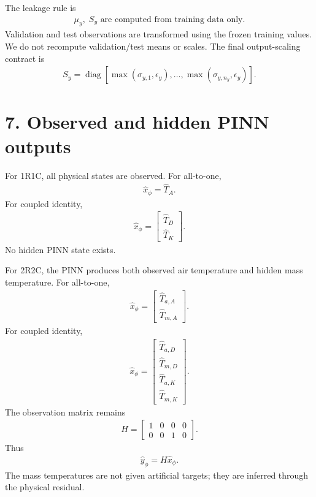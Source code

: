 \documentclass[11pt]{article}
\begin{document}
The leakage rule is
\begin{align}
\boxed{\mu_y,\;S_y\text{ are computed from training data only.}}
\tag{P2.28}
\end{align}
Validation and test observations are transformed using the frozen training values. We do not recompute validation/test means or scales. The final output-scaling contract is
\begin{align}
\boxed{S_y=\operatorname{diag}\left[\max(\sigma_{y,1},\epsilon_y),\ldots,\max(\sigma_{y,n_y},\epsilon_y)\right].}
\tag{P2.29}
\end{align}

\section*{7. Observed and hidden PINN outputs}
For 1R1C, all physical states are observed. For all-to-one,
\begin{align}
\boxed{\widehat x_\phi=\widehat T_A.}
\tag{P2.30}
\end{align}
For coupled identity,
\begin{align}
\boxed{\widehat x_\phi=\begin{bmatrix}\widehat T_D\\\widehat T_K\end{bmatrix}.}
\tag{P2.31}
\end{align}
No hidden PINN state exists.

For 2R2C, the PINN produces both observed air temperature and hidden mass temperature. For all-to-one,
\begin{align}
\boxed{\widehat x_\phi=\begin{bmatrix}\widehat T_{a,A}\\\widehat T_{m,A}\end{bmatrix}.}
\tag{P2.32}
\end{align}
For coupled identity,
\begin{align}
\boxed{\widehat x_\phi=\begin{bmatrix}\widehat T_{a,D}\\\widehat T_{m,D}\\\widehat T_{a,K}\\\widehat T_{m,K}\end{bmatrix}.}
\tag{P2.33}
\end{align}
The observation matrix remains
\begin{align}
\boxed{H=\begin{bmatrix}1&0&0&0\\0&0&1&0\end{bmatrix}.}
\tag{P2.34}
\end{align}
Thus
\begin{align}
\boxed{\widehat y_\phi=H\widehat x_\phi.}
\tag{P2.35}
\end{align}
The mass temperatures are not given artificial targets; they are inferred through the physical residual.
\end{document}
